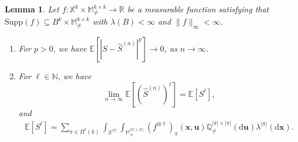 \documentclass{article}
\newtheorem{lemma}[theorem]{Lemma}
\theoremstyle{definition}
\numberwithin{equation}{section}
\theoremstyle{remark}
\newcommand{\E}{\mathbb{E}}
\newcommand{\N}{\mathbb{N}}
\newcommand{\supp}{\mathrm{Supp}}
\begin{document}
\begin{lemma}\label{lem:limits_S_n}
    Let $f: \mathbb{X}^k\times \mathbb{M}^{k\times k}_{\neq}\to\mathbb{R}$ be a measurable function satisfying that $\supp(f)\subseteq B^k\times\mathbb{M}^{k\times k}_{\ne}$ with $\lambda(B)<\infty$ and $\|f\|_{\infty}<\infty$.  
    \begin{enumerate}
        \item[1)] For $p>0$, we have $\E\left[\left|S-\widehat{S}^{(n)}\right|^p\right]\to0$, as $n\to\infty$.
        \item[2)] For $\ell\in\N$, we have 
       \begin{equation} \lim_{n\to\infty}\E\left[(\widehat{S}^{(n)})^{\ell}\right]=\E\left[S^{\ell}\right],
       \end{equation}
       and 
       \begin{eqnarray}
        \E[S^{\ell}]=\sum_{\pi\in\Pi^\ell(k)}\int_{\mathbb{X}^{|\pi|}}\int_{\mathbb{M}^{|\pi|\times|\pi|}_{\ne}}(f^{\otimes\ell})_{\pi}(\bm{x},\bm{u})\mathbb{Q}^{|\pi|\times|\pi|}_{\ne}(\mathrm{d}\bm{u})\lambda^{|\pi|}(\mathrm{d}\bm{x}).
       \end{eqnarray}
    \end{enumerate}
\end{lemma}
\end{document}
